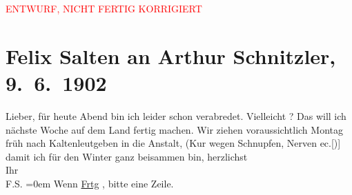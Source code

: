 
\begin{center}
            \textcolor{red}{ENTWURF, NICHT FERTIG KORRIGIERT}
                      \end{center}
            
         \renewcommand{\erwaehnteOrte}{Orte: Kaltenleutgeben, Kaltwasserheilanstalt Winternitz, Wien}
         \renewcommand{\erwaehnteWerke}{}
               \section[Felix Salten an Arthur Schnitzler, 9. 6. 1902]{ Felix Salten an Arthur Schnitzler, 9. 6. 1902}\nopagebreak{}\rehead{ }\begin{ledgroupsized}[t]{13cm}\normalsize\beginnumbering \toendnotes[C]{\smallbreak\pagebreak[2]} 
\toendnotes[C]{\smallbreak}\pstart
           \noindent{}{\pb}Lieber, für heute Abend bin ich leider schon verabredet. Vielleicht
                  \label{K_L03332-1v}\label{K_L03332-1h}? Das \label{K_L03332-11v}\label{K_L03332-11h} will ich nächste Woche auf dem Land fertig machen.\pend
           \pstart
           Wir ziehen voraussichtlich Montag früh nach Kaltenleutgeben in die Anstalt, (Kur wegen Schnupfen, Nerven
                  ec.{[}){]} damit ich für den Winter ganz {\pb}beisammen bin, \pend
           \pstart
           herzlichst {\\[\baselineskip]}Ihr {\\[\baselineskip]}\spacefill\mbox{F.S.}\pend
           \leftskip=0em{}\pstart
           \noindent{}Wenn \uline{Frtg}{ }, bitte eine Zeile. \pend
           
         
         \endnumbering{}\end{ledgroupsized}\begin{anhang}\end{anhang}\newcommand{\dateiname}{L03332}\newcommand{\titel}{Felix Salten an Arthur Schnitzler, 9. 6. 1902}\newcommand{\editorInnen}{Martin Anton Müller und Laura Untner}
      